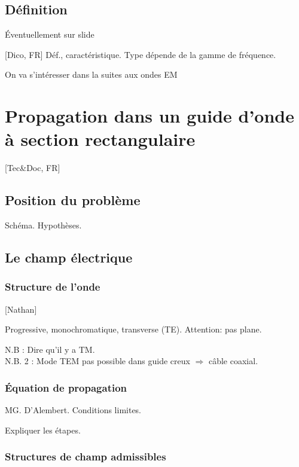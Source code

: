 \documentclass[11pt]{report}
\numberwithin{figure}{section}
\numberwithin{equation}{section}
\numberwithin{table}{section}
\newcommand{\1}{\boldsymbol{1}}
\begin{document}
  
\subsection*{Définition}

\textcolor{mycolor5}{Éventuellement sur slide}
 
[Dico, FR] Déf., caractéristique. Type dépende de la gamme de fréquence.
  
\textcolor{mycolor5}{On va s'intéresser dans la suites aux ondes EM}
  

\section{Propagation dans un guide d'onde à section rectangulaire}

[Tec\&Doc, FR]


\subsection{Position du problème}

Schéma. Hypothèses. 

\subsection{Le champ électrique}


\subsubsection{Structure de l'onde}

[Nathan]

Progressive, monochromatique, transverse (TE). Attention: pas plane.

N.B : Dire qu'il y a TM. \\
N.B. 2 : Mode TEM pas possible dans guide creux $\Rightarrow$ câble coaxial.

\subsubsection{Équation de propagation}

MG. D'Alembert. Conditions limites.

Expliquer les étapes.

\subsubsection{Structures de champ admissibles}
\end{document}

